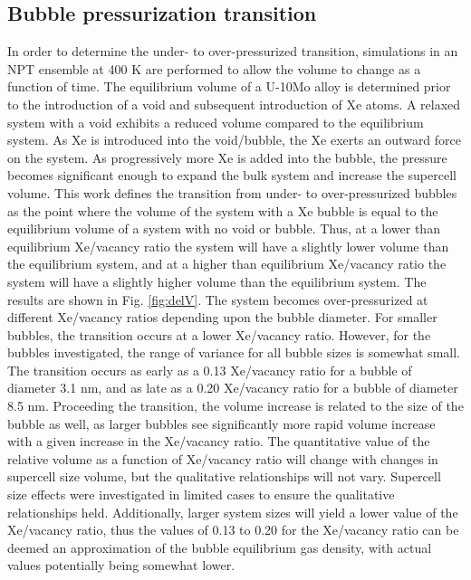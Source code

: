 \documentclass[review]{elsarticle}
\begin{document}
\FloatBarrier

\subsection{Bubble pressurization transition}

In order to determine the under- to over-pressurized transition, simulations in an NPT ensemble at 400 K are performed to allow the volume to change as a function of time. The equilibrium volume of a U-10Mo alloy is determined prior to the introduction of a void and subsequent introduction of Xe atoms. A relaxed system with a void exhibits a reduced volume compared to the equilibrium system. As Xe is introduced into the void/bubble, the Xe exerts an outward force on the system. As progressively more Xe is added into the bubble, the pressure becomes significant enough to expand the bulk system and increase the supercell volume. This work defines the transition from under- to over-pressurized bubbles as the point where the volume of the system with a Xe bubble is equal to the equilibrium volume of a system with no void or bubble. Thus, at a lower than equilibrium Xe/vacancy ratio the system will have a slightly lower volume than the equilibrium system, and at a higher than equilibrium Xe/vacancy ratio the system will have a slightly higher volume than the equilibrium system. The results are shown in Fig. \ref{fig:delV}. The system becomes over-pressurized at different Xe/vacancy ratios depending upon the bubble diameter. For smaller bubbles, the transition occurs at a lower Xe/vacancy ratio. However, for the bubbles investigated, the range of variance for all bubble sizes is somewhat small. The transition occurs as early as a 0.13 Xe/vacancy ratio for a bubble of diameter 3.1 nm, and as late as a 0.20 Xe/vacancy ratio for a bubble of diameter 8.5 nm. Proceeding the transition, the volume increase is related to the size of the bubble as well, as larger bubbles see significantly more rapid volume increase with a given increase in the Xe/vacancy ratio. The quantitative value of the relative volume as a function of Xe/vacancy ratio will change with changes in supercell size volume, but the qualitative relationships will not vary. Supercell size effects were investigated in limited cases to ensure the qualitative relationships held. Additionally, larger system sizes will yield a lower value of the Xe/vacancy ratio, thus the values of 0.13 to 0.20 for the Xe/vacancy ratio can be deemed an approximation of the bubble equilibrium gas density, with actual values potentially being somewhat lower. 
\end{document}
